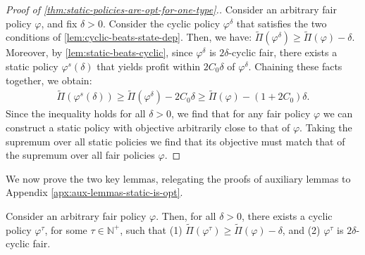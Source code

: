 \documentclass[12pt]{article}
\begin{document}
\begin{proof}[Proof of \cref{thm:static-policies-are-opt-for-one-type}.]
Consider an arbitrary fair policy $\varphi$, and fix $\delta > 0$. Consider the cyclic policy $\varphi^\delta$ that satisfies the two conditions of \cref{lem:cyclic-beats-state-dep}. Then, we have: $\widetilde{\Pi}(\varphi^\delta) \geq \widetilde{\Pi}(\varphi)-\delta$. Moreover, by \cref{lem:static-beats-cyclic}, since $\varphi^\delta$ is $2\delta$-cyclic fair, there exists a static policy ${\varphi}^s(\delta)$ that yields profit within $2C_0\delta$ of $\varphi^{\delta}$. Chaining these facts together, we obtain:
\begin{align*}
     \widetilde{\Pi}(\varphi^s(\delta)) \geq \widetilde{\Pi}(\varphi^\delta)-2C_0\delta \geq \widetilde{\Pi}(\varphi)-(1+2C_0)\delta.
\end{align*}
{Since the inequality holds for all $\delta>0$, we find that for any fair policy $\varphi$ we can construct a static policy with objective arbitrarily close to that of $\varphi$. Taking the supremum over all static policies we find that its objective must match that of the supremum over all fair policies $\varphi$.}
\end{proof}



We now prove the two key lemmas, relegating the proofs of auxiliary lemmas to Appendix \ref{apx:aux-lemmas-static-is-opt}.

\begin{lemma}\label{lem:cyclic-beats-state-dep}
Consider an arbitrary fair policy $\varphi$. Then, for all $\delta > 0$, there exists a cyclic policy $\varphi^\tau$, for some $\tau \in \mathbb{N}^+$, such that (1) $\widetilde{\Pi}(\varphi^{\tau}) \geq \widetilde{\Pi}(\varphi)-\delta$, and (2) $\varphi^\tau$ is $2\delta$-cyclic fair.
\end{lemma}
\end{document}
